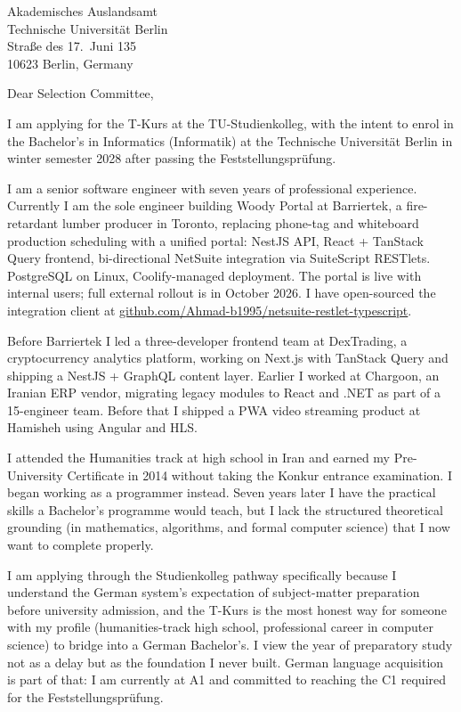




\begin{letter}{
  Akademisches Auslandsamt\\
  Technische Universität Berlin\\
  Straße des 17.\ Juni 135\\
  10623 Berlin, Germany
}

\opening{Dear Selection Committee,}

I am applying for the T-Kurs at the TU-Studienkolleg, with the intent to enrol in the Bachelor's in Informatics (Informatik) at the Technische Universität Berlin in winter semester 2028 after passing the Feststellungsprüfung.

I am a senior software engineer with seven years of professional experience. Currently I am the sole engineer building Woody Portal at Barriertek, a fire-retardant lumber producer in Toronto, replacing phone-tag and whiteboard production scheduling with a unified portal: NestJS API, React + TanStack Query frontend, bi-directional NetSuite integration via SuiteScript RESTlets. PostgreSQL on Linux, Coolify-managed deployment. The portal is live with internal users; full external rollout is in October 2026. I have open-sourced the integration client at \href{https://github.com/Ahmad-b1995/netsuite-restlet-typescript}{github.com/Ahmad-b1995/netsuite-restlet-typescript}.

Before Barriertek I led a three-developer frontend team at DexTrading, a cryptocurrency analytics platform, working on Next.js with TanStack Query and shipping a NestJS + GraphQL content layer. Earlier I worked at Chargoon, an Iranian ERP vendor, migrating legacy modules to React and .NET as part of a 15-engineer team. Before that I shipped a PWA video streaming product at Hamisheh using Angular and HLS.

I attended the Humanities track at high school in Iran and earned my Pre-University Certificate in 2014 without taking the Konkur entrance examination. I began working as a programmer instead. Seven years later I have the practical skills a Bachelor's programme would teach, but I lack the structured theoretical grounding (in mathematics, algorithms, and formal computer science) that I now want to complete properly.

I am applying through the Studienkolleg pathway specifically because I understand the German system's expectation of subject-matter preparation before university admission, and the T-Kurs is the most honest way for someone with my profile (humanities-track high school, professional career in computer science) to bridge into a German Bachelor's. I view the year of preparatory study not as a delay but as the foundation I never built. German language acquisition is part of that: I am currently at A1 and committed to reaching the C1 required for the Feststellungsprüfung.


\end{letter}
